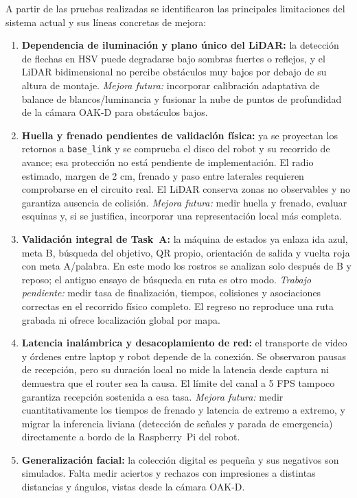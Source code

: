 \documentclass[11pt,a4paper]{article}
\begin{document}
A partir de las pruebas realizadas se identificaron las principales limitaciones
del sistema actual y sus líneas concretas de mejora:

\begin{enumerate}
  \item \textbf{Dependencia de iluminación y plano único del LiDAR:} la
  detección de flechas en HSV puede degradarse bajo sombras fuertes o reflejos, y
  el LiDAR bidimensional no percibe obstáculos muy bajos por debajo de su altura
  de montaje. \emph{Mejora futura:} incorporar calibración adaptativa de balance
  de blancos/luminancia y fusionar la nube de puntos de profundidad de la cámara
  OAK-D para obstáculos bajos.
  \item \textbf{Huella y frenado pendientes de validación física:} ya se
  proyectan los retornos a \texttt{base\_link} y se comprueba el disco del robot
  y su recorrido de avance; esa protección no está pendiente de implementación.
  El radio estimado, margen de 2 cm, frenado y paso entre laterales requieren
  comprobarse en el circuito real. El LiDAR conserva zonas no observables y
  no garantiza ausencia de colisión. \emph{Mejora futura:} medir huella y frenado,
  evaluar esquinas y, si se justifica, incorporar una representación local más completa.
  \item \textbf{Validación integral de Task~A:} la máquina de estados ya
  enlaza ida azul, meta B, búsqueda del objetivo, QR propio, orientación de
  salida y vuelta roja con meta A/palabra. En este modo los rostros se analizan
  solo después de B y reposo; el antiguo ensayo de búsqueda en ruta es otro
  modo. \emph{Trabajo pendiente:} medir tasa de finalización, tiempos, colisiones
  y asociaciones correctas en el recorrido físico completo. El regreso no
  reproduce una ruta grabada ni ofrece localización global por mapa.
  \item \textbf{Latencia inalámbrica y desacoplamiento de red:} el transporte de
  video y órdenes entre laptop y robot depende de la conexión. Se observaron
  pausas de recepción, pero su duración local no mide la latencia desde captura
  ni demuestra que el router sea la causa. El límite del canal a 5 FPS tampoco
  garantiza recepción sostenida a esa tasa.
  \emph{Mejora futura:} medir cuantitativamente los tiempos de frenado y latencia
  de extremo a extremo, y migrar la inferencia liviana (detección de señales y
  parada de emergencia) directamente a bordo de la Raspberry~Pi del robot.
  \item \textbf{Generalización facial:} la colección digital es pequeña y sus
  negativos son simulados. Falta medir aciertos y rechazos con impresiones a
  distintas distancias y ángulos, vistas desde la cámara OAK-D.
\end{enumerate}
\end{document}
